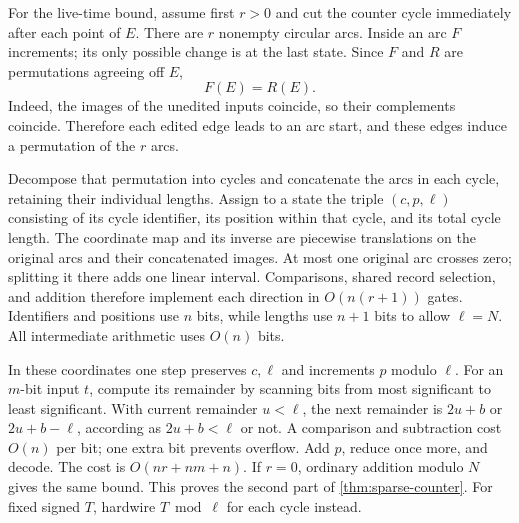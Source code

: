 \documentclass[11pt]{article}
\theoremstyle{definition}
\theoremstyle{remark}
\numberwithin{equation}{section}
\begin{document}
For the live-time bound, assume first $r>0$ and cut the counter cycle
immediately after each point of $E$.  There are $r$ nonempty circular
arcs.  Inside an arc $F$ increments; its only possible change is at the
last state.  Since $F$ and $R$ are permutations agreeing off $E$,
\[
 F(E)=R(E).
\]
Indeed, the images of the unedited inputs coincide, so their complements
coincide.  Therefore each edited edge leads to an arc start, and these
edges induce a permutation of the $r$ arcs.

Decompose that permutation into cycles and concatenate the arcs in each
cycle, retaining their individual lengths.  Assign to a state the triple
$(c,p,\ell)$ consisting of its cycle identifier, its position within that
cycle, and its total cycle length.  The coordinate map and its inverse
are piecewise translations on the original arcs and their concatenated
images.  At most one original arc crosses zero; splitting it there adds
one linear interval.  Comparisons, shared record selection, and addition
therefore implement each direction in $O(n(r+1))$ gates.  Identifiers and
positions use $n$ bits, while lengths use $n+1$ bits to allow $\ell=N$.
All intermediate arithmetic uses $O(n)$ bits.

In these coordinates one step preserves $c,\ell$ and increments $p$
modulo $\ell$.  For an $m$-bit input $t$, compute its remainder by scanning
bits from most significant to least significant.  With current remainder
$u<\ell$, the next remainder is $2u+b$ or $2u+b-\ell$, according as
$2u+b<\ell$ or not.  A comparison and subtraction cost $O(n)$ per bit;
one extra bit prevents overflow.  Add $p$, reduce once more, and decode.
The cost is $O(nr+nm+n)$.  If $r=0$, ordinary addition modulo $N$ gives
the same bound.  This proves the second part of \cref{thm:sparse-counter}.
For fixed signed $T$, hardwire $T\bmod\ell$ for each cycle instead.
\end{document}
